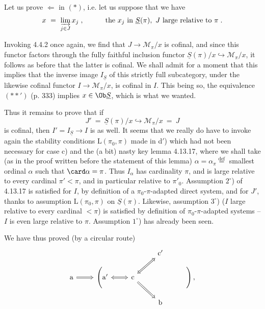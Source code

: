 Let us prove $\Longleftarrow$ in $(*)$, i.e. let us suppose that we have
\[
x \ = \ \varinjlim_{j\in J} x_j \; , \qquad\quad \text{the } x_j \text{ in } \underline{S}(\pi),\ J \text{ large relative to } \pi \; .
\]



Invoking 4.4.2 once again, we find that $J \longrightarrow \mathcal{M}_\pi/x$ is cofinal, and since this functor factors through the fully faithful inclusion functor $\underline{S}(\pi)/x \hookrightarrow \mathcal{M}_\pi/x$, it follows as before that the latter is cofinal. We shall admit for a moment that this implies that the inverse image $I_{\underline{S}}$ of this strictly full subcategory, under the likewise cofinal functor $I \longrightarrow \mathcal{M}_\pi/x$, is cofinal in $I$. This being so, the equivalence $(**')$ (p. 333) implies $x \in \Ob\underline{S}$, which is what we wanted.

Thus it remains to prove that if
\[
J' \ = \ \underline{S}(\pi)/x \hookrightarrow \mathcal{M}_\pi/x \ = \ J
\]
is cofinal, then $I' = I_{\underline{S}} \longrightarrow I$ is as well. It seems that we really do have to invoke again the stability conditions $\mathrm{L}(\pi_0,\pi)$ made in d$'$) which had not been necessary for case c) and
the (a bit) nasty key lemma 4.13.17, where we shall take (as in the proof written
before the statement of this lemma) %
$\alpha = \alpha_\pi \overset{\text{def}}{=}$ smallest ordinal $\alpha$ such that $\card\alpha = \pi$. Thus $I_\alpha$ has cardinality $\pi$, and is large relative to every cardinal $\pi' < \pi$, and in particular relative to $\pi'_0$. Assumption $2^\circ$) of 4.13.17 is satisfied for $I$, by definition of a $\pi_0$-$\pi$-adapted direct system, and for $J'$, thanks to assumption $\mathrm{L}(\pi_0,\pi)$ on $\underline{S}(\pi)$. Likewise, assumption $3^\circ$) ($I$ large relative to every cardinal $< \pi$) is satisfied by definition of $\pi_0$-$\pi$-adapted systems -- $I$ is even large relative to $\pi$. Assumption $1^\circ$) has already been seen.

We have thus proved (by a circular route)
\[
\begin{tikzcd}[row sep=small]
& & & \mathrm{c}' & \\
\mathrm{a} \arrow[r, Rightarrow] & \Bigg(\mathrm{a}' \arrow[r, Leftrightarrow] & \mathrm{c} \arrow[ur, Leftrightarrow] \arrow[dr, Rightarrow] & & \Bigg)\, , \\ %
& & & \mathrm{b} &
\end{tikzcd}
\]

